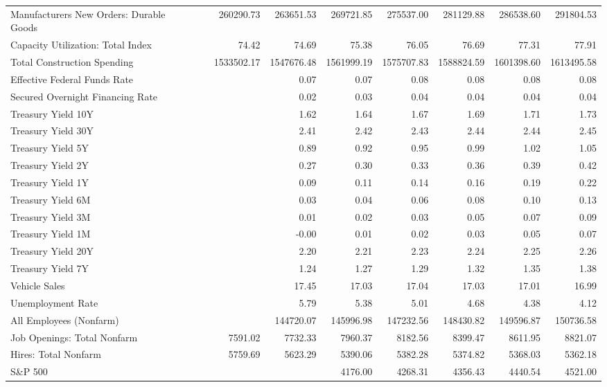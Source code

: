 \documentclass[11pt, letterpaper]{article}\usepackage[]{graphicx}\usepackage[]{color}
\begin{document}
\begin{table}[H]
\begin{tabular}{lrrrrrrrr}
  Manufacturers New Orders: Durable Goods &  & 260290.73 & 263651.53 & 269721.85 & 275537.00 & 281129.88 & 286538.60 & 291804.53 \\ 
  Capacity Utilization: Total Index &  & 74.42 & 74.69 & 75.38 & 76.05 & 76.69 & 77.31 & 77.91 \\ 
  Total Construction Spending &  & 1533502.17 & 1547676.48 & 1561999.19 & 1575707.83 & 1588824.59 & 1601398.60 & 1613495.58 \\ 
  Effective Federal Funds Rate &  &  & 0.07 & 0.07 & 0.08 & 0.08 & 0.08 & 0.08 \\ 
  Secured Overnight Financing Rate &  &  & 0.02 & 0.03 & 0.04 & 0.04 & 0.04 & 0.04 \\ 
  Treasury Yield 10Y &  &  & 1.62 & 1.64 & 1.67 & 1.69 & 1.71 & 1.73 \\ 
  Treasury Yield 30Y &  &  & 2.41 & 2.42 & 2.43 & 2.44 & 2.44 & 2.45 \\ 
  Treasury Yield 5Y &  &  & 0.89 & 0.92 & 0.95 & 0.99 & 1.02 & 1.05 \\ 
  Treasury Yield 2Y &  &  & 0.27 & 0.30 & 0.33 & 0.36 & 0.39 & 0.42 \\ 
  Treasury Yield 1Y &  &  & 0.09 & 0.11 & 0.14 & 0.16 & 0.19 & 0.22 \\ 
  Treasury Yield 6M &  &  & 0.03 & 0.04 & 0.06 & 0.08 & 0.10 & 0.13 \\ 
  Treasury Yield 3M &  &  & 0.01 & 0.02 & 0.03 & 0.05 & 0.07 & 0.09 \\ 
  Treasury Yield 1M &  &  & -0.00 & 0.01 & 0.02 & 0.03 & 0.05 & 0.07 \\ 
  Treasury Yield 20Y &  &  & 2.20 & 2.21 & 2.23 & 2.24 & 2.25 & 2.26 \\ 
  Treasury Yield 7Y &  &  & 1.24 & 1.27 & 1.29 & 1.32 & 1.35 & 1.38 \\ 
  Vehicle Sales &  &  & 17.45 & 17.03 & 17.04 & 17.03 & 17.01 & 16.99 \\ 
  Unemployment Rate &  &  & 5.79 & 5.38 & 5.01 & 4.68 & 4.38 & 4.12 \\ 
  All Employees (Nonfarm) &  &  & 144720.07 & 145996.98 & 147232.56 & 148430.82 & 149596.87 & 150736.58 \\ 
  Job Openings: Total Nonfarm &  & 7591.02 & 7732.33 & 7960.37 & 8182.56 & 8399.47 & 8611.95 & 8821.07 \\ 
  Hires: Total Nonfarm &  & 5759.69 & 5623.29 & 5390.06 & 5382.28 & 5374.82 & 5368.03 & 5362.18 \\ 
  S\&P 500 &  &  &  & 4176.00 & 4268.31 & 4356.43 & 4440.54 & 4521.00 \\ 

\end{tabular}
\end{table}
\end{document}
